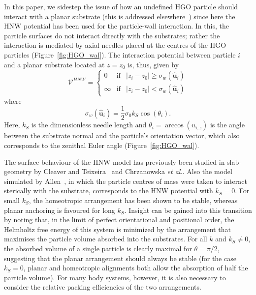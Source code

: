 \documentclass[aps,10pt,twocolumn]{revtex4}
\makeatletter
\newcommand{\mrm}[1]{\mathrm{#1}}
\newcommand{\vecth}[1]{ \mathbf{\hat{#1} } }
\newcommand{\so}{\sigma_0}
\newcommand{\ui}{\vecth{u}_i}
\newcommand{\etal}{\emph{et al.}\@\xspace}
\makeatother
\begin{document}
In this paper, we sidestep the issue of how an undefined HGO particle should interact with a planar substrate
(this is addressed elsewhere~\cite{fbThesis,BarmesCleaver03b}) since here the HNW potential has been used for the
particle-wall interaction. In this, the particle surfaces do not interact directly with the substrates; rather the
interaction is mediated by axial needles placed at the centres of the HGO particles (Figure~\ref{fig:HGO_wal}).
The interaction potential between particle $i$ and a planar substrate located at $z=z_0$ is, thus, given
by~\cite{Cleaver_Teixeira_01}
\begin{equation}
\mathcal{V}^{HNW} = \left\{ %
    \begin{array}{ccc}
    0               &\mrm{if}   &|z_i-z_0| \geq \sigma_w(\ui)  \\
    \infty          &\mrm{if}   &|z_i-z_0| < \sigma_w(\ui)
    \end{array}
    \right.
\end{equation}
where
\begin{equation}
        \sigma_w(\ui) = \frac{1}{2}\so k_S\cos(\theta_i).
    \label{eqn:sigma_w_HNW}
\end{equation}
Here, $k_S$ is the dimensionless needle length and $\theta_i=\arccos(u_{i,z})$ is the angle between the substrate
normal and the particle's orientation vector, which also corresponds to the zenithal Euler angle
(Figure~\ref{fig:HGO_wal}).

The surface behaviour of the HNW model has previously been studied in slab-geometry by Cleaver and
Teixeira~\cite{Cleaver_Teixeira_01} and Chrza\-now\-ska \etal\cite{Chrzanowska_Teixera_01}. Also the model
simulated by Allen~\cite{Allen99}, in which the particle centres of mass were taken to interact sterically with
the substrate, corresponds to the HNW potential with $k_S=0$. For small $k_S$, the homeotropic arrangement has
been shown to be stable, whereas planar anchoring is favoured for long $k_S$. Insight can be gained into this
transition by noting that, in the limit of perfect orientational and positional order, the Helmholtz free energy
of this system is minimized by the arrangement that maximises the particle volume absorbed into the substrates.
For all $k$ and $k_S\neq 0$, the absorbed volume of a single particle is clearly maximal for $\theta=\pi/2$,
suggesting that the planar arrangement should always be stable (for the case $k_S=0$, planar and homeotropic
alignments both allow the absorption of half the particle volume). For many body systems, however, it is also
necessary to consider the relative packing efficiencies of the two arrangements.
\end{document}
